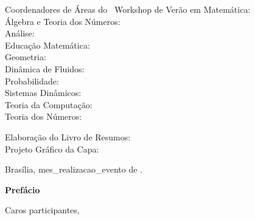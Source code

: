 \begin{flushleft}
		\noindent Coordenadores de \'{A}reas do \edworkshop\ Workshop de Ver\~{a}o em Matem\'{a}tica: \\
		\noindent \'{A}lgebra e Teoria dos N\'{u}meros: \coordalgebra \\
		\noindent An\'{a}lise: \coordanalise \\
		\noindent Educa\c{c}\~{a}o Matem\'{a}tica: \coordedumat\\
		\noindent Geometria: \coordgeometria \\
		\noindent Dinâmica de Fluidos: \coorddinflui \\
		\noindent Probabilidade: \coordprobab \\
		\noindent Sistemas Din\^{a}micos:  \coordsistdin \\
		\noindent Teoria da Computa\c{c}\~{a}o: \coordteocomp\\
		\noindent Teoria dos N\'{u}meros: \coordteonumeros\\
	\end{flushleft}
	
	\vspace{1.15cm}
	
	\noindent Elabora\c{c}\~{a}o do Livro de Resumos: \livresumos \\
	\noindent Projeto Gr\'{a}fico da Capa: \artcapa
	
	\vspace{1.15cm}
	
	\begin{center}
		Bras\'{i}lia, mes_realizacao_evento de \ano.
	\end{center}
	
	\newpage\clearpage
	
	
	
	

	\begin{center}
	\huge{{\bf Pref\'{a}cio}}
	\vspace{1cm}
	\end{center}

Caros participantes,

\vspace{24pt}

